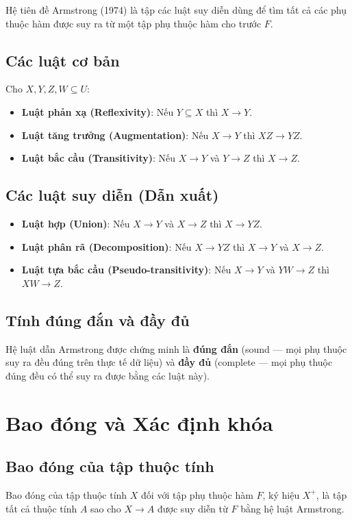 Hệ tiên đề Armstrong (1974) \cite{armstrong1974} là tập các luật suy diễn dùng để tìm tất cả các phụ thuộc hàm được suy ra từ một tập phụ thuộc hàm cho trước $F$.

\subsection{Các luật cơ bản}
Cho $X, Y, Z, W \subseteq U$:
\begin{itemize}
    \item \textbf{Luật phản xạ (Reflexivity)}: Nếu $Y \subseteq X$ thì $X \rightarrow Y$.
    \item \textbf{Luật tăng trưởng (Augmentation)}: Nếu $X \rightarrow Y$ thì $XZ \rightarrow YZ$.
    \item \textbf{Luật bắc cầu (Transitivity)}: Nếu $X \rightarrow Y$ và $Y \rightarrow Z$ thì $X \rightarrow Z$.
\end{itemize}

\subsection{Các luật suy diễn (Dẫn xuất)}
\begin{itemize}
    \item \textbf{Luật hợp (Union)}: Nếu $X \rightarrow Y$ và $X \rightarrow Z$ thì $X \rightarrow YZ$.
    \item \textbf{Luật phân rã (Decomposition)}: Nếu $X \rightarrow YZ$ thì $X \rightarrow Y$ và $X \rightarrow Z$.
    \item \textbf{Luật tựa bắc cầu (Pseudo-transitivity)}: Nếu $X \rightarrow Y$ và $YW \rightarrow Z$ thì $XW \rightarrow Z$.
\end{itemize}

\subsection{Tính đúng đắn và đầy đủ}
Hệ luật dẫn Armstrong được chứng minh là \textbf{đúng đắn} (sound --- mọi phụ thuộc suy ra đều đúng trên thực tế dữ liệu) và \textbf{đầy đủ} (complete --- mọi phụ thuộc đúng đều có thể suy ra được bằng các luật này).

\section{Bao đóng và Xác định khóa}

\subsection{Bao đóng của tập thuộc tính}
Bao đóng của tập thuộc tính $X$ đối với tập phụ thuộc hàm $F$, ký hiệu $X^+$, là tập tất cả thuộc tính $A$ sao cho $X \rightarrow A$ được suy diễn từ $F$ bằng hệ luật Armstrong.

